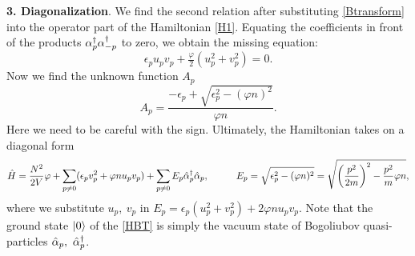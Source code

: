 \textbf{3. Diagonalization}. We find the second relation after substituting \eqref{Btransform} into the operator part of the Hamiltonian \eqref{H1}. Equating the coefficients in front of the products $\alpha_p^{\dag} \alpha_{-p}^{\dag}$ to zero, we obtain the missing equation:
\begin{equation*}
	\epsilon_p u_p v_p + \tfrac{\varphi}{2} (u_p^2 + v_p^2) = 0.
\end{equation*}
Now we find the unknown function $A_p$
\begin{equation}
	A_p = \frac{-\epsilon_p + \sqrt{\epsilon_p^2-(\varphi n)^2}}{\varphi n}.
	\label{Ap}
\end{equation}
Here we need to be careful with the sign. Ultimately, the Hamiltonian takes on a diagonal form
\begin{equation}
	\hat{H} = \frac{N^2}{2V}\varphi + \sum_{p \neq 0} (\epsilon_p v_p^2 + \varphi n u_p v_p) + \sum_{p \neq 0} E_p \hat{\alpha}\D_p \hat{\alpha}_p,
	\hspace{10 mm} 
	E_p = \sqrt{\epsilon_p^2 - (\varphi n)^2} = \sqrt{\left(\frac{p^2}{2m}\right)^2 - \frac{p^2}{m} \varphi n},
	\label{HBT}
\end{equation}
where we substitute $u_p,\ v_p$ in  $E_p = \epsilon_p (u_p^2 + v_p^2) + 2 \varphi n u_p v_p$. Note that the ground state $\left| 0 \right\rangle$ of the \eqref{HBT} is simply the vacuum state of Bogoliubov quasi-particles $\hat{\alpha}_p,\ \hat{\alpha}_p\D$.


